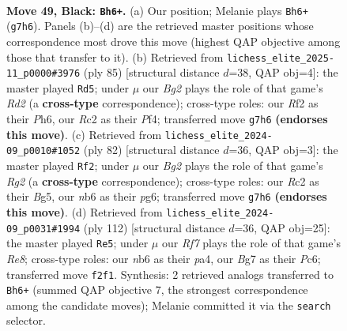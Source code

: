 \documentclass[11pt]{article}
\begin{document}
\clearpage

\begin{figure}[p]\centering
\begin{subfigure}{0.46\textwidth}\centering
\resizebox{\linewidth}{!}{%
\newchessgame
\chessboard[
  setfen={3R4/1p4bk/1N4p1/5p1p/P7/4K1PP/2r2r2/8 b - - 1 49},
  showmover=false,
  pgfstyle=straightmove, color=movearrow, markmove={g7-h6}
]}
\caption{}
\end{subfigure}\hfill
\begin{subfigure}{0.46\textwidth}\centering
\resizebox{\linewidth}{!}{%
\newchessgame
\chessboard[
  setfen={8/1p1r4/p1p1k2p/P7/5p1B/P4P2/4K3/1R6 b - - 0 43},
  showmover=false,
  pgfstyle=straightmove, color=movearrow, markmove={d7-d5}
]}
\caption{}
\end{subfigure}
\\[4pt]
\begin{subfigure}{0.46\textwidth}\centering
\resizebox{\linewidth}{!}{%
\newchessgame
\chessboard[
  setfen={4k3/pp2P3/2p3p1/3p2B1/3P4/2P4r/P5R1/6K1 w - - 1 42},
  showmover=false,
  pgfstyle=straightmove, color=movearrow, markmove={g2-f2}
]}
\caption{}
\end{subfigure}\hfill
\begin{subfigure}{0.46\textwidth}\centering
\resizebox{\linewidth}{!}{%
\newchessgame
\chessboard[
  setfen={1R2R3/5k2/2P4b/7p/p6P/5PPK/P1r5/8 w - - 1 57},
  showmover=false,
  pgfstyle=straightmove, color=movearrow, markmove={e8-e5}
]}
\caption{}
\end{subfigure}
\caption{\textbf{Move 49, Black: \texttt{Bh6+}.} (a) Our position; Melanie plays \texttt{Bh6+} (\texttt{g7h6}). Panels (b)--(d) are the retrieved master positions whose correspondence most drove this move (highest QAP objective among those that transfer to it). (b) Retrieved from \texttt{lichess\_elite\_2025-11\_p0000\#3976} (ply 85) [structural distance $d$=38, QAP obj=4]: the master played \texttt{Rd5}; under $\mu$ our \emph{Bg2} plays the role of that game's \emph{Rd2} (a \textbf{cross-type} correspondence); cross-type roles: our \emph{R}f2 as their \emph{P}h6, our \emph{R}c2 as their \emph{P}f4; transferred move \texttt{g7h6} \textbf{(endorses this move)}. (c) Retrieved from \texttt{lichess\_elite\_2024-09\_p0010\#1052} (ply 82) [structural distance $d$=36, QAP obj=3]: the master played \texttt{Rf2}; under $\mu$ our \emph{Bg2} plays the role of that game's \emph{Rg2} (a \textbf{cross-type} correspondence); cross-type roles: our \emph{R}c2 as their \emph{B}g5, our \emph{n}b6 as their \emph{p}g6; transferred move \texttt{g7h6} \textbf{(endorses this move)}. (d) Retrieved from \texttt{lichess\_elite\_2024-09\_p0031\#1994} (ply 112) [structural distance $d$=36, QAP obj=25]: the master played \texttt{Re5}; under $\mu$ our \emph{Rf7} plays the role of that game's \emph{Re8}; cross-type roles: our \emph{n}b6 as their \emph{p}a4, our \emph{B}g7 as their \emph{P}c6; transferred move \texttt{f2f1}. Synthesis: 2 retrieved analogs transferred to \texttt{Bh6+} (summed QAP objective 7, the strongest correspondence among the candidate moves); Melanie committed it via the \texttt{search} selector.}
\label{fig:thought-m97}
\end{figure}
\end{document}
